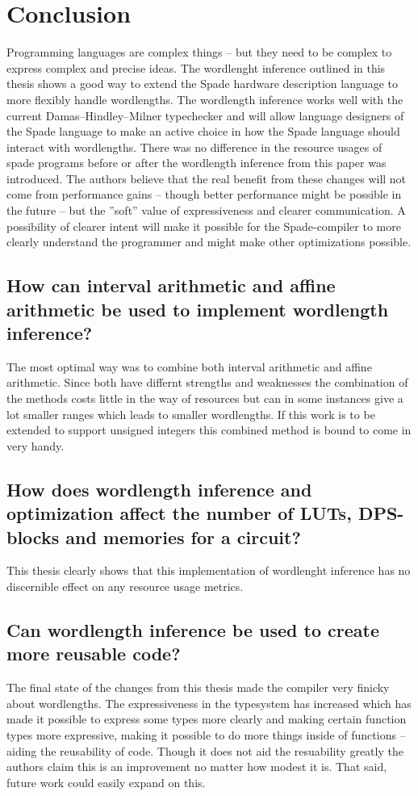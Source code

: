 \chapter{Conclusion}
\label{cha:Conclusion}
Programming languages are complex things -- but they need to be complex to express complex and precise ideas. The wordlenght inference outlined in this thesis shows a good way to extend the Spade hardware description language to more flexibly handle wordlengths. The wordlength inference works well with the current Damas–Hindley–Milner typechecker and will allow language designers of the Spade language to make an active choice in how the Spade language should interact with wordlengths. There was no difference in the resource usages of spade programs before or after the wordlength inference from this paper was introduced. The authors believe that the real benefit from these changes will not come from performance gains -- though better performance might be possible in the future -- but the ''soft'' value of expressiveness and clearer communication. A possibility of clearer intent will make it possible for the Spade-compiler to more clearly understand the programmer and might make other optimizations possible.


\section{How can interval arithmetic and affine arithmetic be used to implement wordlength inference?}
The most optimal way was to combine both interval arithmetic and affine arithmetic. Since both have differnt strengths and weaknesses the combination of the methods costs little in the way of resources but can in some instances give a lot smaller ranges which leads to smaller wordlengths. If this work is to be extended to support unsigned integers this combined method is bound to come in very handy. 

\section{How does wordlength inference and optimization affect the number of LUTs, DPS-blocks and memories for a circuit?}
This thesis clearly shows that this implementation of wordlenght inference has no discernible effect on any resource usage metrics.

\section{Can wordlength inference be used to create more reusable code?}
The final state of the changes from this thesis made the compiler very finicky about wordlengths. The expressiveness in the typesystem has increased which has made it possible to express some types more clearly and making certain function types more expressive, making it possible to do more things inside of functions -- aiding the reusability of code. Though it does not aid the resuability greatly the authors claim this is an improvement no matter how modest it is. That said, future work could easily expand on this.

